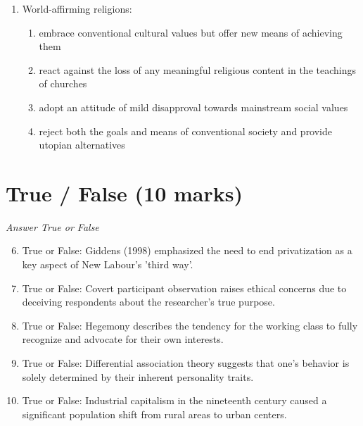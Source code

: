 \documentclass[12pt]{article}
\begin{document}
\begin{enumerate}[label=\arabic*.]
\begin{enumerate}[label=(\alph*)]
    \item They are cultures as well as churches.
    \item They practice separation of church and state.
    \item They exclude women as clergy.
    \item They are monotheistic.
\end{enumerate}
\item World-affirming religions:
\begin{enumerate}[label=(\alph*)]
    \item embrace conventional cultural values but offer new means of achieving them
    \item react against the loss of any meaningful religious content in the teachings of churches
    \item adopt an attitude of mild disapproval towards mainstream social values
    \item reject both the goals and means of conventional society and provide utopian alternatives
\end{enumerate}
\end{enumerate}

\section*{True / False (10 marks)}
\textit{Answer True or False}
\begin{enumerate}[label=\arabic*.]
\setcounter{enumi}{5}
\item True or False: Giddens (1998) emphasized the need to end privatization as a key aspect of New Labour's 'third way'.
\item True or False: Covert participant observation raises ethical concerns due to deceiving respondents about the researcher's true purpose.
\item True or False: Hegemony describes the tendency for the working class to fully recognize and advocate for their own interests.
\item True or False: Differential association theory suggests that one's behavior is solely determined by their inherent personality traits.
\item True or False: Industrial capitalism in the nineteenth century caused a significant population shift from rural areas to urban centers.
\end{enumerate}
\end{document}
